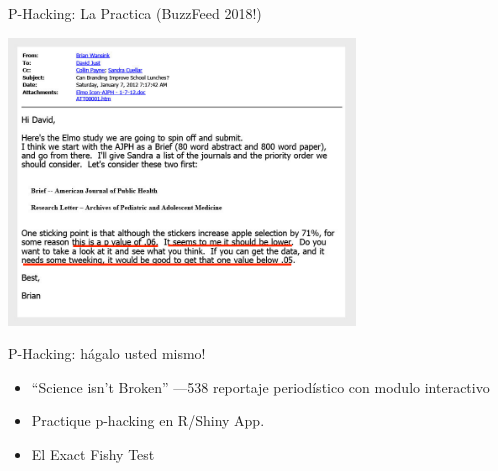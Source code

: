 \documentclass{beamer}
\begin{document}
\begin{frame}{P-Hacking: La Practica  (BuzzFeed 2018!)}

\includegraphics[height=3in]{../Images/phacking.PNG}

\end{frame}

\begin{frame}{P-Hacking: hágalo usted mismo!}
\begin{itemize}
\item
``Science isn't Broken'' ---538 reportaje periodístico con modulo interactivo \href{http://fivethirtyeight.com/features/science-isnt-broken}{}
\item 
Practique p-hacking en R/Shiny App. \href{http://www.nicebread.de/introducing-p-hacker/}{}
\item
El Exact Fishy Test \href{https://macartan.shinyapps.io/fish/}{}
\end{itemize}
\end{frame}
\end{document}

